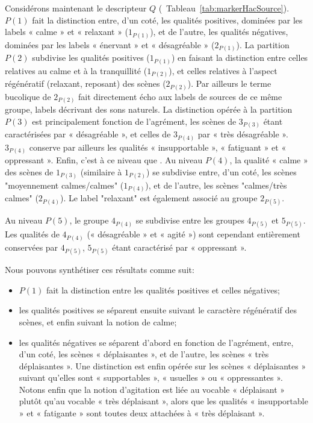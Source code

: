 Considérons maintenant le descripteur $Q$ (\cf~Tableau~\ref{tab:markerHacSource}). $P(1)$ fait la distinction entre, d'un coté, les qualités positives, dominées par les labels « calme » et « relaxant » ($1_{P(1)}$), et de l'autre, les qualités négatives, dominées par les labels « énervant » et « désagréable » ($2_{P(1)}$). La partition $P(2)$ subdivise les qualités positives ($1_{P(1)}$) en faisant la distinction entre celles relatives au calme et à la tranquillité ($1_{P(2)}$), et celles relatives à l'aspect régénératif (relaxant, reposant) des scènes ($2_{P(2)}$). Par ailleurs le terme bucolique de $2_{P(2)}$ fait directement écho aux labels de sources de ce même groupe, labels décrivant des sons naturels. La distinction opérée à la partition $P(3)$ est principalement fonction de l'agrément, les scènes de $3_{P(3)}$ étant caractérisées par « désagréable », et celles de $3_{P(4)}$ par « très désagréable ». $3_{P(4)}$ conserve par ailleurs les qualités « insupportable », « fatiguant » et « oppressant ». Enfin, c'est à ce niveau que  . Au niveau $P(4)$, la qualité « calme » des scènes de $1_{P(3)}$ (similaire à $1_{P(2)}$) se subdivise entre, d'un coté, les scènes "moyennement calmes/calmes" ($1_{P(4)}$), et de l'autre, les scènes "calmes/très calmes" ($2_{P(4)}$). Le label "relaxant" est également associé au groupe $2_{P(5)}$.

Au niveau $P(5)$, le groupe $4_{P(4)}$ se subdivise entre les groupes $4_{P(5)}$ et $5_{P(5)}$. Les qualités de $4_{P(4)}$ (« désagréable » et « agité ») sont cependant entièrement conservées par $4_{P(5)}$, $5_{P(5)}$ étant caractérisé par « oppressant ».

Nous pouvons synthétiser ces résultats comme suit:

\begin{itemize}
\item $P(1)$ fait la distinction entre les qualités positives et celles négatives;
\item les qualités positives se séparent ensuite suivant le caractère régénératif des scènes, et enfin suivant la notion de calme;
\item les qualités négatives se séparent d'abord en fonction de l'agrément, entre, d'un coté, les scènes « déplaisantes », et de l'autre, les scènes « très déplaisantes ». Une distinction est enfin opérée sur les scènes « déplaisantes » suivant qu'elles sont « supportables », « usuelles » ou « oppressantes ». Notons enfin que la notion d'agitation est liée au vocable « déplaisant » plutôt qu'au vocable « très déplaisant », alors que les qualités « insupportable » et « fatigante » sont toutes deux attachées à « très déplaisant ».
\end{itemize}

